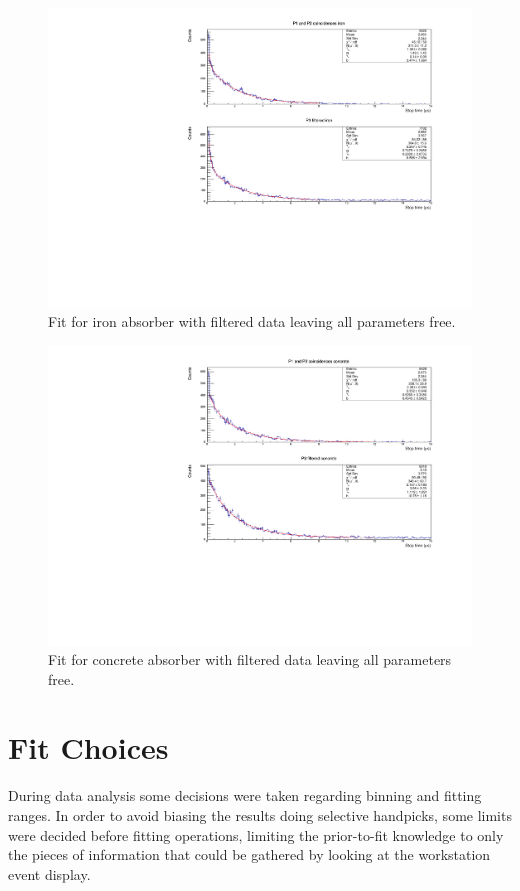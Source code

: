 \documentclass[../main.tex]{subfiles}
\begin{document}
     \FloatBarrier

     \begin{figure}[htb!]
         \centering
         \includegraphics[width=0.9\linewidth]{images/1_over_r_iron_fit.pdf}
         \caption{Fit for iron absorber with filtered data leaving all parameters free.}
         \label{fig:allFreeIron}
     \end{figure}

    \begin{figure}[htb!]
         \centering
         \includegraphics[width=0.9\linewidth]{images/1_over_r_concrete_fit.pdf}
         \caption{Fit for concrete absorber with filtered data leaving all parameters free.}
         \label{fig:allFreeConcrete}
     \end{figure}
\FloatBarrier
\section{Fit Choices}
During data analysis some decisions were taken regarding binning and fitting ranges. In order to avoid biasing the results doing selective handpicks, some limits were decided before fitting operations, limiting the prior-to-fit knowledge to only the pieces of information that could be gathered by looking at the workstation event display.\\
\end{document}
